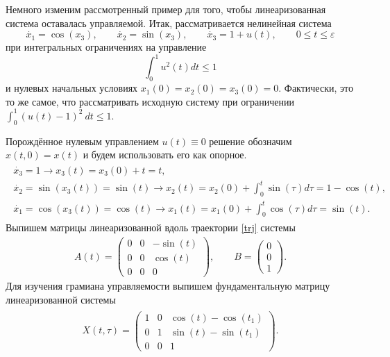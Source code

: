 \documentclass[../main.tex]{subfiles}
\begin{document}
	Немного изменим рассмотренный пример для того, чтобы линеаризованная система оставалась управляемой. Итак, рассматривается нелинейная система
	\begin{equation}\label{unicycle1}
		\dot{x_1} = \cos(x_3), \qquad
		\dot{x_2} = \sin(x_3), \qquad
		\dot{x_3} = 1 + u(t), \qquad 0 \leq t \leq \varepsilon
	\end{equation}
	при интегральных ограничениях на управление 
	\begin{equation*}
		\int_0^1 u^2(t) dt \leqslant 1
	\end{equation*}
	и нулевых начальных условиях $ x_1(0) = x_2(0) = x_3(0) = 0 $. Фактически, это то же самое, что рассматривать исходную систему при ограничении $ \displaystyle{\int_0^1} \left( u(t) - 1\right)^2 \ dt \leqslant 1$.
	
	Порождённое нулевым управлением $ u(t) \equiv 0 $ решение обозначим $ x(t,0) = x(t) $ и будем использовать его как опорное. 
	\begin{gather}\label{trj}
		\begin{gathered}
			\dot{x_3} = 1 \longrightarrow x_3(t) = x_3(0) + t = t, \\
			\dot{x_2} = \sin(x_3(t)) = \sin(t) \longrightarrow x_2(t) = x_2(0) + \int_0^t \sin(\tau) d\tau = 1 - \cos(t),\\
			\dot{x_1} = \cos(x_3(t)) = \cos(t) \longrightarrow x_1(t) = x_1(0) + \int_0^t \cos(\tau) d\tau = \sin(t).
		\end{gathered}
	\end{gather}
	Выпишем матрицы линеаризованной вдоль траектории \eqref{trj} системы 
	\begin{gather*}
		A(t) = \begin{pmatrix}
			0 & 0 & -\sin(t) \\ 
			0 & 0 & \cos(t) \\ 
			0 & 0 & 0
		\end{pmatrix}, \qquad  B = \begin{pmatrix}
			0 \\ 
			0 \\ 
			1
		\end{pmatrix}.
	\end{gather*}
	Для изучения грамиана управляемости выпишем фундаментальную матрицу линеаризованной системы
	\begin{gather*}
		\begin{gathered}
			X(t,\tau) = \begin{pmatrix}
				1 & 0 & \cos(t)-\cos(t_1) \\ 
				0 & 1 & \sin(t)-\sin(t_1) \\ 
				0 & 0 & 1
			\end{pmatrix}.
		\end{gathered}	
	\end{gather*}
\end{document}
